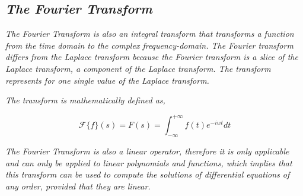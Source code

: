 

\subsection{\textit{The Fourier Transform}}

	\textit{The Fourier Transform is also an integral transform that transforms a function from the time domain to the complex frequency-domain. The Fourier transform differs from the Laplace transform because the Fourier transform is a slice of the Laplace transform, a component of the Laplace transform. The transform represents for one single value of the Laplace transform.}

	\textit{The transform is mathematically defined as,}

		$$\mathcal{F}\{f\}(s) = F(s) = \int_{-\infty}^{+\infty}f(t)e^{-iwt} dt$$

	\textit{The Fourier Transform is also a linear operator, therefore it is only applicable and can only be applied to linear polynomials and functions, which implies that this transform can be used to compute the solutions of differential equations of any order, provided that they are linear.}

